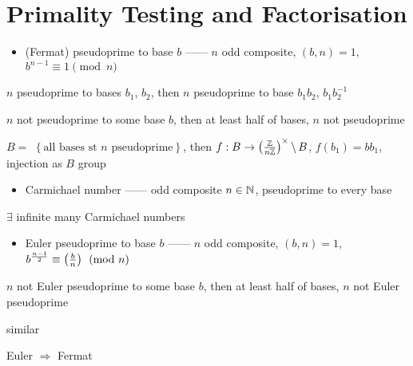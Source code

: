 \section{Primality Testing and Factorisation}\label{sec:primality-testing-and-factorisation}

\begin{itemize}
    \item (Fermat) pseudoprime to base $b$ ------ $n$ odd composite, $(b, n) = 1$, $b^{n-1} \equiv 1 \pmod{n}$
\end{itemize}

\begin{lemma}
    $n$ pseudoprime to bases $b_1$, $b_2$, then $n$ pseudoprime to base $b_1 b_2$, $b_1 b_2^{-1}$
\end{lemma}

\begin{prop}
    $n$ not pseudoprime to some base $b$, then at least half of bases, $n$ not pseudoprime
\end{prop}
\begin{pf}
    $B = $ $\left\{ \text{all bases st } n \text{ pseudoprime} \right\}$, then $f : B \rightarrow \left( \frac{\mathbb{Z}}{n\mathbb{Z}} \right)^\times \backslash \, B$,
    $f(b_1) = b b_1$, injection as $B$ group
\end{pf}

\begin{itemize}
    \item Carmichael number ------ odd composite $n \in \mathbb{N}$, pseudoprime to every base
\end{itemize}

\begin{fact}
    $\exists$ infinite many Carmichael numbers
\end{fact}

\begin{itemize}
    \item Euler pseudoprime to base $b$ ------ $n$ odd composite, $(b, n) = 1$, $b^{\frac{n-1}{2}} \equiv \left( \frac{b}{n} \right) \pmod{n}$
\end{itemize}

\begin{prop}
    $n$ not Euler pseudoprime to some base $b$, then at least half of bases, $n$ not Euler pseudoprime
\end{prop}
\begin{pf}
    similar
\end{pf}

\begin{fact}
    Euler $\Rightarrow$ Fermat
\end{fact}

